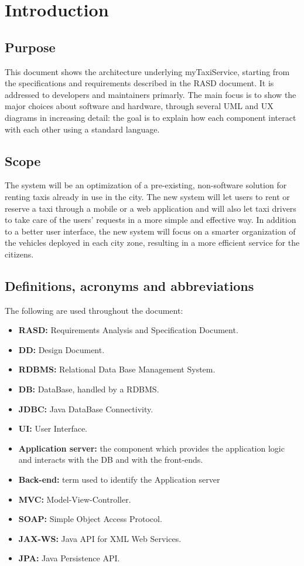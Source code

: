 \section{Introduction}

\subsection{Purpose}
This document shows the architecture underlying myTaxiService, starting from the specifications and requirements described in the RASD document. It is addressed to developers and maintainers primarly. The main focus is to show the major choices about software and hardware, through several UML and UX diagrams in increasing detail: the goal is to explain how each component interact with each other using a standard language.

\subsection{Scope}
The system will be an optimization of a pre-existing, non-software solution for renting taxis already in use in the city. The new system will let users to rent or reserve a taxi through a mobile or a web application and will also let taxi drivers to take care of the users' requests in a more simple and effective way. In addition to a better user interface, the new system will focus on a smarter organization of the vehicles deployed in each city zone, resulting in a more efficient service for the citizens.

\subsection{Definitions, acronyms and abbreviations}
The following are used throughout the document:
\begin{itemize}
\item\textbf{RASD:} Requirements Analysis and Specification Document.
\item\textbf{DD:} Design Document.
\item\textbf{RDBMS:} Relational Data Base Management System.
\item\textbf{DB:} DataBase, handled by a RDBMS.
\item\textbf{JDBC:} Java DataBase Connectivity.
\item\textbf{UI:} User Interface.
\item\textbf{Application server:} the component which provides the application logic and interacts with the DB and with the front-ends.
\item\textbf{Back-end:} term used to identify the Application server
\item\textbf{MVC:} Model-View-Controller.
\item\textbf{SOAP:} Simple Object Access Protocol.
\item\textbf{JAX-WS:} Java API for XML Web Services.
\item\textbf{JPA:} Java Persistence API.
\end{itemize}